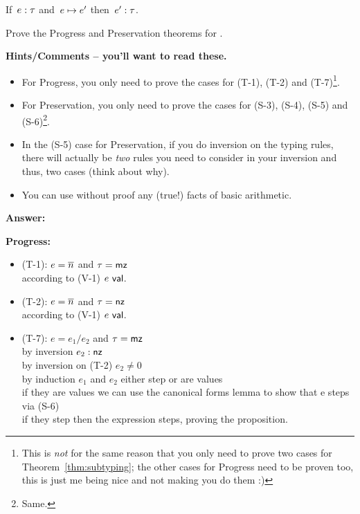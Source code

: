 \documentclass{article}
\begin{document}
\begin{thm}[Preservation]
  If~$e : \tau$ and~$e \mapsto e'$ then~$e' : \tau$.
\end{thm}

\begin{task}
  Prove the Progress and Preservation theorems for {\ezlang}.

  \textbf{Hints/Comments -- you'll want to read these.}
  \begin{itemize}
  \item For Progress, you only need to prove the cases for (T-1), (T-2) and
    (T-7)\footnote{This is {\em not} for the same reason that you only need
    to prove two cases for Theorem~\ref{thm:subtyping}; the other cases
    for Progress need to be proven too, this is just me being nice and not
    making you do them :)}.
  \item For Preservation, you only need to prove the cases for (S-3),
    (S-4), (S-5) and (S-6)\footnote{Same.}.
  \item In the (S-5) case for Preservation, if you do inversion on the typing
    rules, there will actually be {\em two} rules you need to consider in your
    inversion and thus, two cases (think about why).
  \item You can use without proof any (true!) facts of basic arithmetic.
  \end{itemize}
\end{task}

\textbf{Answer:}

\textbf{Progress:}
\begin{itemize}
    \item (T-1): $e = \overline{n}$ and $\tau = \mathsf{mz}$ \\
        according to (V-1) $e ~\mathsf{val}$.
    \item (T-2): $e = \overline{n}$ and $\tau = \mathsf{nz}$ \\
        according to (V-1) $e ~\mathsf{val}$.
    \item (T-7): $e = e_1 / e_2$ and $\tau = \mathsf{mz}$ \\
        by inversion $e_2 : \mathsf{nz}$\\
        by inversion on (T-2) $e_2 \neq 0$\\
        by induction $e_1$ and $e_2$ either step or are values\\ 
        if they are values we can use the canonical forms lemma to show that e steps via (S-6)\\
        if they step then the expression steps, proving the proposition.
\end{itemize}
\end{document}
